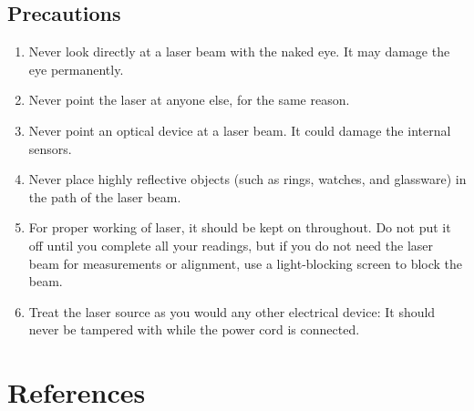 \begin{refsection}
\subsection*{Precautions}

\begin{enumerate}
    \item Never look directly at a laser beam with the naked eye. It may damage the eye permanently.
    \item Never point the laser at anyone else, for the same reason.
    \item Never point an optical device at a laser beam. It could damage the internal sensors.
    \item Never place highly reflective objects (such as rings, watches, and glassware) in the path of the laser beam.
    \item For proper working of laser, it should be kept on throughout. Do not put it off until you complete all your readings, but if you do not need the laser beam for measurements or alignment, use a light-blocking screen to block the  beam.
    \item Treat the laser source as you would any other electrical device: It should never be tampered with while the power cord is connected.
\end{enumerate}


\section*{References}


\nocite{khaparde_training_2008}
\nocite{stanley_use_1986}
\nocite{jenkins_fundamentals_2017}
\nocite{pathak_diffraction_2015}

\printbibliography[heading=none]



\newpage

\end{refsection}